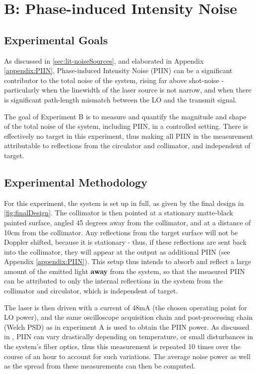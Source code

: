\section{B: Phase-induced Intensity Noise}
\label{sec:PIINTesting}
\subsection{Experimental Goals}
As discussed in \autoref{sec:lit-noiseSources}, and elaborated in Appendix \ref{appendix:PIIN}, Phase-induced Intensity Noise (PIIN) can be a significant contributor to the total noise of the system, rising far above shot-noise - particularly when the linewidth of the laser source is not narrow, and when there is significant path-length mismatch between the LO and the transmit signal.

 The goal of Experiment B is to measure and quantify the magnitude and shape of the total noise of the system, including PIIN, in a controlled setting. There is effectively no target in this experiment, thus making all PIIN in the measurement attributable to reflections from the circulator and collimator, and independent of target. 
 
 
 \subsection{Experimental Methodology}
 For this experiment, the system is set up in full, as given by the final design in \autoref{fig:finalDesign}. The collimator is then pointed at a stationary matte-black painted surface, angled 45 degrees away from the collimator, and at a distance of 10cm from the collimator. Any reflections from the target surface will not be Doppler shifted, because it is stationary - thus, if these reflections are sent back into the collimator, they will appear at the output as additional PIIN (see Appendix \ref{appendix:PIIN}). This setup thus intends to absorb and reflect a large amount of the emitted light \textbf{away} from the system, so that the measured PIIN can be attributed to only the internal reflections in the system from the collimator and circulator, which is independent of target. 
 
 The laser is then driven with a current of 48mA (the chosen operating point for LO power), and the same oscilloscope acquisition chain and post-processing chain (Welch PSD) as in experiment A is used to obtain the PIIN power. As discussed in \cite{jiang_performance_2019}, PIIN can vary drastically depending on temperature, or small disturbances in the system's fiber optics, thus this measurement is repeated 10 times over the course of an hour to account for such variations. The average noise power as well as the spread from these measurements can then be computed. 
 


